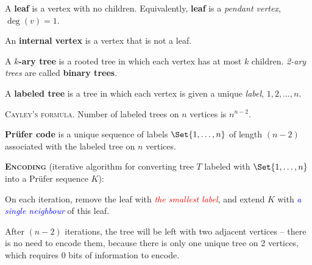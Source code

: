 \documentclass[a4paper,10pt]{article}
\newcommand{\op}[1]{\operatorname*{#1}}
\newcommand{\degree}[1]{\op{deg}(#1)}
\begin{document}
\begin{terms}
\begin{terms}

        \item A \textbf{leaf} is a vertex with no children. Equivalently, \textbf{leaf} is a \emph{pendant vertex}, \ie $\degree{v} = 1$.
        \item An \textbf{internal vertex} is a vertex that is not a leaf.

        \item A \textbf{$k$-ary tree} is a rooted tree in which each vertex has at most $k$ children. \emph{2-ary trees} are called \textbf{binary trees}.
    \end{terms}

    \item A \textbf{labeled tree} is a tree in which each vertex is given a unique \emph{label}, \eg $1, 2, \dotsc, n$.

    \item \textsc{Cayley's formula}. Number of labeled trees on $n$ vertices is $n^{n-2}$.

    \item \textbf{Pr\"{u}fer code} is a unique sequence of labels $\Set{1,\dotsc,n}$ of length $(n-2)$ associated with the labeled tree on $n$ vertices.
    \begin{terms}
        \item \textbf{\textsc{Encoding}} (iterative algorithm for converting tree $T$ labeled with $\Set{1,\dotsc,n}$ into a Pr\"{u}fer sequence $K$):
        \begin{terms}
            \item On each iteration, remove the leaf with \textcolor{red}{\emph{the smallest label}}, and extend $K$ with \textcolor{blue}{\emph{a single neighbour}} of this leaf.
            \item After $(n-2)$ iterations, the tree will be left with two adjacent vertices \--- there is no need to encode them, because there is only one unique tree on 2 vertices, which requires 0 bits of information to encode.
        \end{terms}


\end{terms}
\end{terms}
\end{document}
